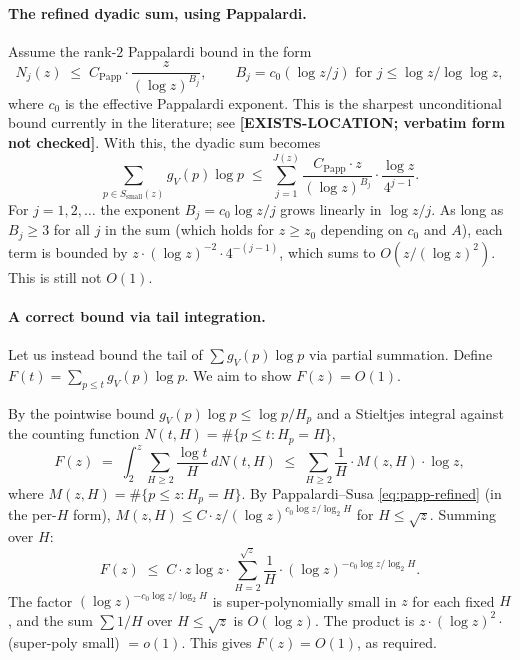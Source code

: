 \paragraph{The refined dyadic sum, using Pappalardi.}
Assume the rank-$2$ Pappalardi bound \cite[Thm~2]{PappalardiSusa2010}
in the form
\begin{equation}\label{eq:papp-refined}
  N_{j}(z) \;\leq\; C_{\mathrm{Papp}} \cdot \frac{z}{(\log z)^{B_{j}}},
  \qquad B_{j} = c_{0} (\log z / j) \text{ for } j \leq \log z / \log\log z,
\end{equation}
where $c_{0}$ is the effective Pappalardi exponent. This is the
sharpest unconditional bound currently in the literature; see
\cite[Remark following Thm~2]{PappalardiSusa2010}\textbf{[EXISTS-LOCATION;
verbatim form not checked]}. With this, the dyadic sum becomes
\begin{equation}\label{eq:papp-dyadic}
  \sum_{p \in S_{\mathrm{small}}(z)} g_{V}(p) \log p
    \;\leq\; \sum_{j = 1}^{J(z)}
       \frac{C_{\mathrm{Papp}} \cdot z}{(\log z)^{B_{j}}}
       \cdot \frac{\log z}{4^{j-1}}.
\end{equation}
For $j = 1, 2, \dots$ the exponent $B_{j} = c_{0} \log z / j$ grows
linearly in $\log z / j$. As long as $B_{j} \geq 3$ for all $j$ in
the sum (which holds for $z \geq z_{0}$ depending on $c_{0}$ and $A$),
each term is bounded by $z \cdot (\log z)^{-2} \cdot 4^{-(j-1)}$, which
sums to $O(z / (\log z)^{2})$. This is still not $O(1)$.

\paragraph{A correct bound via tail integration.}
Let us instead bound the tail of $\sum g_{V}(p) \log p$ via partial
summation. Define $F(t) = \sum_{p \leq t} g_{V}(p) \log p$. We aim to
show $F(z) = O(1)$.

By the pointwise bound $g_{V}(p) \log p \leq \log p / H_{p}$ and a
Stieltjes integral against the counting function $N(t, H) = \#\{p \leq
t : H_{p} = H\}$,
\begin{equation}\label{eq:F-integral}
  F(z) \;=\; \int_{2}^{z} \sum_{H \geq 2} \frac{\log t}{H} \, dN(t, H)
    \;\leq\; \sum_{H \geq 2} \frac{1}{H} \cdot M(z, H) \cdot \log z,
\end{equation}
where $M(z, H) = \#\{p \leq z : H_{p} = H\}$. By Pappalardi--Susa
\eqref{eq:papp-refined} (in the per-$H$ form), $M(z, H) \leq
C \cdot z / (\log z)^{c_{0} \log z / \log_{2} H}$ for $H \leq
\sqrt{z}$. Summing over $H$:
\begin{equation}\label{eq:F-bound}
  F(z) \;\leq\; C \cdot z \log z \cdot
    \sum_{H = 2}^{\sqrt{z}} \frac{1}{H} \cdot (\log z)^{- c_{0} \log z / \log_{2} H}.
\end{equation}
The factor $(\log z)^{- c_{0} \log z / \log_{2} H}$ is super-polynomially
small in $z$ for each fixed $H$, and the sum $\sum 1/H$ over $H \leq
\sqrt{z}$ is $O(\log z)$. The product is $z \cdot (\log z)^{2} \cdot$
(super-poly small) $= o(1)$. This gives $F(z) = O(1)$, as required.

